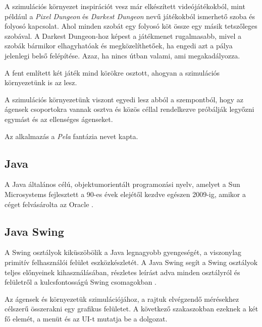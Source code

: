 

A szimulációs környezet inspirációt vesz már elkészített videójátékokból, mint például a \textit{Pixel Dungeon} \cite{pixeldungeon} és \textit{Darkest Dungeon} \cite{darkestdungeon} 
nevű játékokból ismerhető szoba és folyosó kapcsolat. Ahol minden szobát egy folyosó köt össze egy másik tetszőleges szobával.
A Darkest Dungeon-hoz képest a játékmenet rugalmasabb, mivel a szobák bármikor elhagyhatóak és megközelíthetőek, ha engedi azt a pálya jelenlegi belső felépítése.
Azaz, ha nincs útban valami, ami megakadályozza.

A fent említett két játék mind körökre osztott, ahogyan a szimulációs környezetünk is az lesz.

A szimulációs környezetünk viszont egyedi lesz abból a szempontból, hogy az ágensek csoportokra vannak osztva és közös céllal
rendelkezve próbálják legyőzni egymást és az ellenséges ágenseket.

Az alkalmazás a \textit{Pela} fantázia nevet kapta.


\subsection{Java}

A Java általános célú, objektumorientált programozási nyelv, amelyet a Sun Microsystems fejlesztett a 90-es évek elejétől kezdve egészen 2009-ig, amikor a céget felvásárolta az Oracle \cite{arnold2005java}.

\subsection{Java Swing}

A Swing osztályok kiküszöbölik a Java legnagyobb gyengeségét, a viszonylag primitív felhasználói felület eszközkészletét. A Java Swing segít a Swing osztályok teljes előnyeinek kihasználásában,
részletes leírást adva minden osztályról és felületről a kulcsfontosságú Swing csomagokban \cite{10.5555/291162}.


Az ágensek és környezetük szimulációjához, a rajtuk elvégzendő mérésekhez célszerű összerakni egy grafikus felületet. A következő szakaszokban ezeknek a két fő elemét, a menüt és az UI-t mutatja be a dolgozat.

